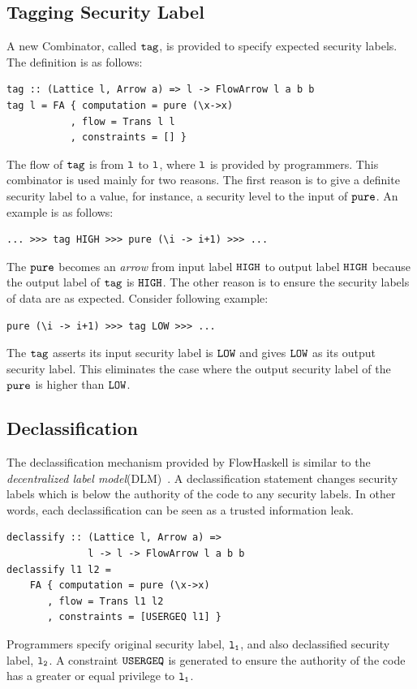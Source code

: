 \documentclass[a4paper]{report}
\newcommand{\co}[1]{$\cod{#1}$}
\begin{document}
\subsection{Tagging Security Label}
A new Combinator, called \co{tag}, is provided to specify expected security labels. The
definition is as follows:
\begin{Verbatim}[fontsize=\footnotesize]
tag :: (Lattice l, Arrow a) => l -> FlowArrow l a b b
tag l = FA { computation = pure (\x->x)
           , flow = Trans l l
           , constraints = [] }
\end{Verbatim}
The flow of \co{tag} is from \co{l} to \co{l}, where \co{l} is provided by programmers.
This combinator is used mainly for two reasons. 
The first reason is to give a definite security label to a value, 
for instance, a security level to the input of \co{pure}. An example is as follows:
\begin{Verbatim}[fontsize=\footnotesize]
    ... >>> tag HIGH >>> pure (\i -> i+1) >>> ...
\end{Verbatim}
The \co{pure} becomes an {\em arrow} from input label \co{HIGH} to output label \co{HIGH} because the 
output label of \co{tag} is \co{HIGH}.
The other reason is to ensure the security labels of data are as expected. 
Consider following example:
\begin{Verbatim}[fontsize=\footnotesize]
    pure (\i -> i+1) >>> tag LOW >>> ...
\end{Verbatim}
The \co{tag} asserts its input security label is \co{LOW} and gives \co{LOW} as its output security label.
This eliminates the case where the output security label of the \co{pure} is higher than \co{LOW}.
\subsection{Declassification}
The declassification mechanism provided by FlowHaskell is similar to the 
{\em decentralized label model}(DLM)~\cite{Myers:Liskov:TSEM2000}.
A declassification statement changes security labels which is below the authority of the 
code to any security labels.
In other words, each declassification can be seen as a trusted information leak. 
\begin{Verbatim}[fontsize=\footnotesize]
declassify :: (Lattice l, Arrow a) => 
              l -> l -> FlowArrow l a b b
declassify l1 l2 =
    FA { computation = pure (\x->x)
       , flow = Trans l1 l2
       , constraints = [USERGEQ l1] }
\end{Verbatim}
Programmers specify original security label, \co{l_1}, and also declassified security
label, \co{l_2}. A constraint \co{USERGEQ} is 
generated to ensure the authority of the code has a greater or equal privilege to \co{l_1}.
\end{document}
